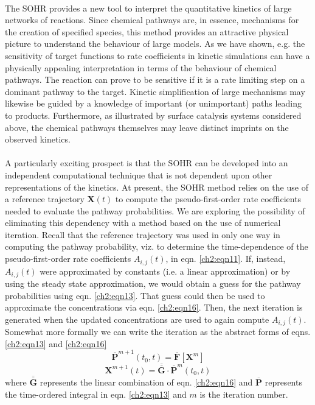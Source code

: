 \paragraph{}
The SOHR provides a new tool to interpret the quantitative kinetics of large networks
of reactions. Since chemical pathways are, in essence, mechanisms for the creation
of specified species, this method provides an attractive physical picture to
understand the behaviour of large models. As we have shown, e.g. the sensitivity of
target functions to rate coefficients in kinetic simulations can have a physically appealing
interpretation in terms of the behaviour of chemical pathways. The reaction can
prove to be sensitive if it is a rate limiting step on a dominant pathway to the target.
Kinetic simplification\cite{ch1_IRPC_67_skodje2001geometrical,ch1_IRPC_68_law2003development,ch1_IRPC_69_maas1992simplifying} of large mechanisms may likewise be guided by a
knowledge of important (or unimportant) paths leading to products. Furthermore, as
illustrated by surface catalysis systems considered above, the chemical pathways themselves
may leave distinct imprints on the observed kinetics.
\newline
\paragraph{}
A particularly exciting prospect is that the SOHR can be developed into an
independent computational technique that is not dependent upon other representations 
of the kinetics. At present, the SOHR method relies on the use of a reference trajectory
$\mathbf{X}(t)$ to compute the pseudo-first-order rate coefficients needed to evaluate the pathway
probabilities. We are exploring the possibility of eliminating this dependency with a
method based on the use of numerical iteration.\cite{ch1_IRPC_18_bai2017simulating} Recall that the reference trajectory
was used in only one way in computing the pathway probability, viz. to determine the
time-dependence of the pseudo-first-order rate coefficients $A_{i,j}(t)$, in eqn. \ref{ch2:eqn11}. If,
instead, $A_{i,j}(t)$ were approximated by constants (i.e. a linear approximation) or by using
the steady state approximation, we would obtain a guess for the pathway probabilities
using eqn. \ref{ch2:eqn13}. That guess could then be used to approximate the concentrations
via eqn. \ref{ch2:eqn16}. Then, the next iteration is generated when the updated concentrations
are used to again compute $A_{i,j}(t)$. Somewhat more formally we can write the iteration
as the abstract forms of eqns. \ref{ch2:eqn13} and \ref{ch2:eqn16}
\begin{equation*}
{\overline{\mathbf{P}}}^{m+1}(t_0,t) = \overline{\mathbf{F}} \left[ {\mathbf{X}}^{m} \right]
\end{equation*}
\begin{equation*}
{\mathbf{X}}^{m+1}(t) = \overline{\overline{\mathbf{G}}} \cdot {\overline{\mathbf{P}}}^{m}(t_0,t)
\end{equation*}
where $\overline{\overline{\mathbf{G}}}$ represents the linear combination of eqn. \ref{ch2:eqn16} and ${\overline{\mathbf{P}}}$ represents the
time-ordered integral in eqn. \ref{ch2:eqn13} and $m$ is the iteration number.